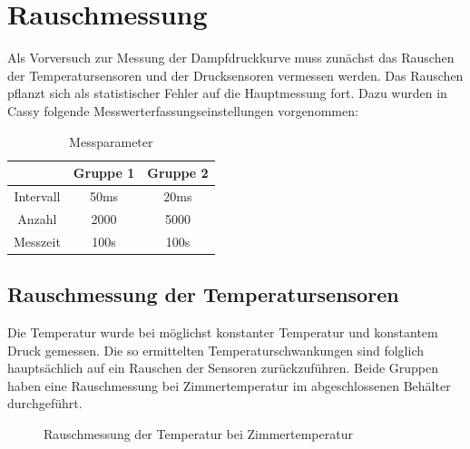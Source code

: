 \documentclass[12pt,a4paper]{article}
\author{Gruppe C14 \\ Julián Häck, Martin Koytek, Lars Wenning, Erik Zimmermann}
\begin{document}
\section{Rauschmessung}
Als Vorversuch  zur Messung der Dampfdruckkurve muss zunächst das Rauschen der Temperatursensoren und der Drucksensoren vermessen werden. Das Rauschen pflanzt sich als statistischer Fehler auf die Hauptmessung fort.
Dazu wurden in Cassy folgende Messwerterfassungseinstellungen vorgenommen:
\begin{table}[H]\centering
\caption{Messparameter}
\begin{tabular}{c|cc}
 & Gruppe 1 & Gruppe 2 \\ 
 \hline
Intervall & 50ms & 20ms \\ 
Anzahl & 2000 & 5000 \\ 
Messzeit & 100s & 100s \\ 
\end{tabular} 
\end{table}


\subsection{Rauschmessung der Temperatursensoren}
Die Temperatur wurde bei möglichst konstanter Temperatur und konstantem Druck gemessen. Die so ermittelten Temperaturschwankungen sind folglich hauptsächlich auf ein Rauschen der Sensoren zurückzuführen. 
Beide Gruppen haben eine Rauschmessung bei Zimmertemperatur im abgeschlossenen Behälter durchgeführt.


\begin{figure}[H]
\caption{Rauschmessung der Temperatur bei Zimmertemperatur}
\end{figure}
\end{document}
